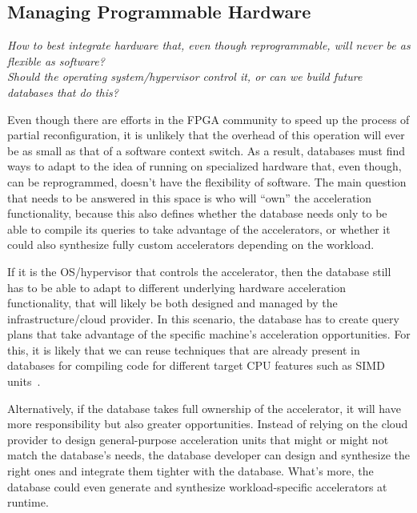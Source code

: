 \documentclass[11pt]{article}
\begin{document}
\subsection{Managing Programmable Hardware}

\emph{How to best integrate hardware that, even though reprogrammable, will never be as flexible as software?}\\
\emph{Should the operating system/hypervisor control it, or can we build future databases that do this?}
\smallskip

Even though there are efforts in the FPGA community to speed up the process of partial reconfiguration, it is unlikely that the overhead of this operation will ever be as small as that of a software context switch. As a result, databases must find ways to adapt to the idea of running on specialized hardware that, even though, can be reprogrammed, doesn't have the flexibility of software. The main question that needs to be answered in this space is who will ``own'' the acceleration functionality, because this also defines whether the database needs only to be able to compile its queries to take advantage of the accelerators, or whether it could also synthesize fully custom accelerators depending on the workload.

If it is the OS/hypervisor that controls the accelerator, then the database still has to be able to adapt to different underlying hardware acceleration functionality, that will likely be both designed and managed by the infrastructure/cloud provider. In this scenario, the database has to create query plans that take advantage of the specific machine's acceleration opportunities. For this, it is likely that we can reuse techniques that are already present in databases for compiling code for different target CPU features such as SIMD units~\cite{pirk-compiler-cidr19}.

Alternatively, if the database takes full ownership of the accelerator, it will have more responsibility but also greater opportunities. Instead of relying on the cloud provider to design general-purpose acceleration units that might or might not match the database's needs, the database developer can design and synthesize the right ones and integrate them tighter with the database. What's more, the database could even generate and synthesize workload-specific accelerators at runtime.
\end{document}
